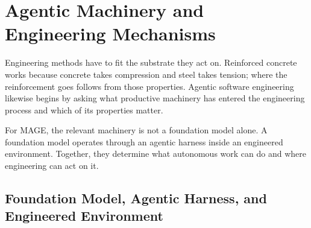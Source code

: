 


\chapter{Agentic Machinery and Engineering Mechanisms}



Engineering methods have to fit the substrate they act on. Reinforced concrete works because concrete takes compression and steel takes tension; where the reinforcement goes follows from those properties. Agentic software engineering likewise begins by asking what productive machinery has entered the engineering process and which of its properties matter.


For MAGE, the relevant machinery is not a foundation model alone. A foundation model operates through an agentic harness inside an engineered environment. Together, they determine what autonomous work can do and where engineering can act on it.

\section{Foundation Model, Agentic Harness, and Engineered Environment}\label{heading:foundation-model-agentic-harness-and-engineered-environment}

